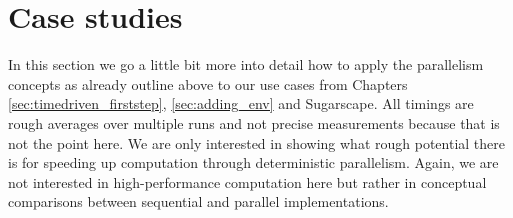 \section{Case studies}
In this section we go a little bit more into detail how to apply the parallelism concepts as already outline above to our use cases from Chapters \ref{sec:timedriven_firststep}, \ref{sec:adding_env} and Sugarscape. All timings are rough averages over multiple runs and not precise measurements because that is not the point here. We are only interested in showing what rough potential there is for speeding up computation through deterministic parallelism. Again, we are not interested in high-performance computation here but rather in conceptual comparisons between sequential and parallel implementations.




\\
